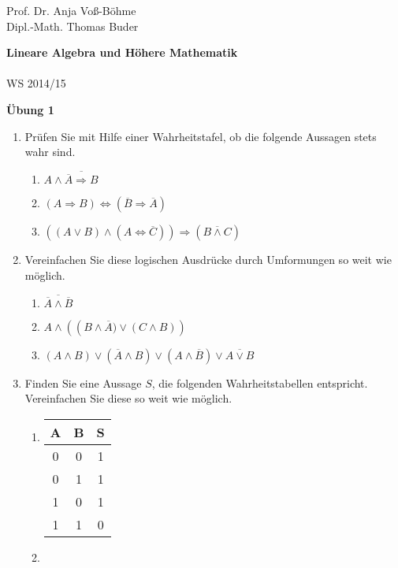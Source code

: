 \documentclass[12pt,a4paper]{scrreprt}
\begin{document}
 
\begin{flushleft}
Prof. Dr.  Anja Voß-Böhme \\
Dipl.-Math. Thomas Buder
\end{flushleft}

\begin{center}{\large\bf Lineare Algebra und Höhere Mathematik} \\ \\ WS 2014/15 \end{center}

\begin{center}{\large\bf Übung 1 } 
\end{center}


\bigskip
\begin{enumerate}
 				\item 
			Prüfen Sie mit Hilfe einer Wahrheitstafel, ob die folgende Aussagen stets wahr sind.
				
				 \begin{enumerate}
				 	\item   $A \wedge \overline{\overline{A} \Rightarrow B} $
	\item   $(A \Rightarrow B) \Leftrightarrow ( \overline{B} \Rightarrow \overline{A}) $
	\item   $\left( (A \vee B) \wedge ( A \Leftrightarrow \overline{C})\right)  \Rightarrow ( \overline{B \wedge C}) $
\end{enumerate}

\item Vereinfachen Sie diese logischen Ausdrücke durch Umformungen so weit wie möglich.
			\begin{enumerate}
					\item   $\overline{ \overline{A} \wedge \overline{B}}$
				 	\item   $A \wedge \left( \left(B \wedge \overline{A}) \vee (C \wedge B) \right)$
					\item $(A \wedge B) \vee (\overline{A} \wedge B) \vee (A \wedge \overline{B}) \vee \overline{ A \vee  B}$
					
\end{enumerate}
 \item Finden Sie eine Aussage $S$, die folgenden Wahrheitstabellen entspricht. Vereinfachen Sie diese so weit wie möglich.

\begin{center}
\begin{enumerate}
\item \begin{tabular}{c c | c}
					A & B & S \\
					\hline 
							0	&0	&1 \\
							0	&1	&1 \\
							1	&0	&1 \\
							1	&1	&0 
							\end{tabular}
  \item 
	

\end{enumerate}
\end{center}
\end{enumerate}
\end{document}
